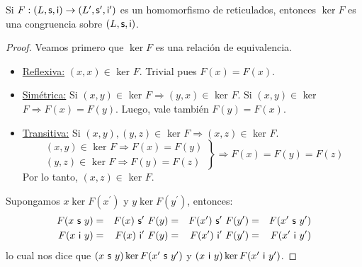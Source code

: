   \begin{lemma} \label{lemma_10}
    \PN Si $F: (L, \mathsf{s}, \mathsf{i}) \rightarrow (L^{\prime}, \mathsf{s}^{\prime}, \mathsf{i}^{\prime})$ es un homomorfismo de reticulados, entonces $\ker F$ es una congruencia sobre
    $(L, \mathsf{s}, \mathsf{i})$.
  \end{lemma}
  \begin{proof}
    \PN Veamos primero que $\ker F$ es una relación de equivalencia.
    \begin{itemize}
      \item \underline{Reflexiva:} $(x, x) \in$ ker $F$. Trivial pues $F(x) = F(x)$.
      \item \underline{Simétrica:} Si $(x, y) \in$ ker $F \Rightarrow (y, x) \in$ ker $F$.
        \PN Si $(x, y) \in$ ker $F \Rightarrow F(x) = F(y)$. Luego, vale también $F(y) = F(x)$.
      \item \underline{Transitiva:} Si $(x, y), (y, z) \in$ ker $F \Rightarrow (x, z) \in$ ker $F$.
        \begin{equation*}
          \left.
          \begin{array}{l}
            (x, y) \in \text{ ker } F \Rightarrow F(x) = F(y) \\
            (y, z) \in \text{ ker } F \Rightarrow F(y) = F(z)
          \end{array}
          \right \rbrace \Rightarrow F(x) = F(y) = F(z)
        \end{equation*}
        \PN Por lo tanto, $(x, z) \in$ ker $F$.
      \end{itemize}

    \PN Supongamos $x \ker F(x^{\prime})$ y $y \ker F(y^{\prime})$, entonces:
    \begin{alignat*}{4}
      F(x \ \mathsf{s} \ y) &=& F(x) \ \mathsf{s^{\prime}} \ F(y) &=& F(x^{\prime}) \ \mathsf{s^{\prime}} \ F(y^{\prime}) &=&
        F(x^{\prime} \ \mathsf{s} \ y^{\prime}) \\
      F(x \ \mathsf{i} \ y) &=& F(x) \ \mathsf{i^{\prime}} \ F(y) &=& F(x^{\prime}) \ \mathsf{i^{\prime}} \ F(y^{\prime}) &=&
        F(x^{\prime} \ \mathsf{i} \ y^{\prime}) \\
    \end{alignat*}
    \PN lo cual nos dice que $(x \ \SU \ y) \ker F(x^{\prime} \ \SU \ y^{\prime})$ y $(x \ \mathsf{i} \ y) \ker F(x^{\prime} \
    \mathsf{i} \ y^{\prime})$.
  \end{proof}

